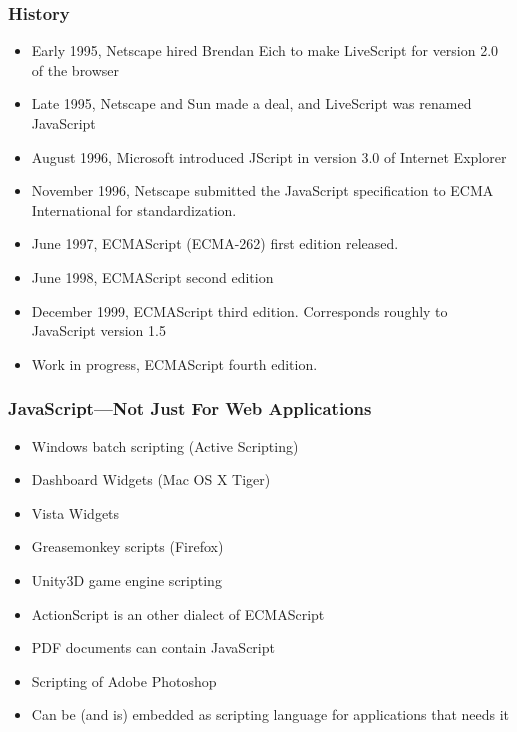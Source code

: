 \documentclass[dvipsnames,handout]{beamer}
\begin{document}
\begin{frame} 
\frametitle{History}

\begin{itemize}
\item Early 1995, Netscape hired Brendan Eich to make LiveScript for
  version 2.0 of the browser
\item Late 1995, Netscape and Sun made a deal, and LiveScript was
  renamed JavaScript
\item August 1996, Microsoft introduced JScript in version 3.0 of Internet
  Explorer
\item November 1996, Netscape submitted the JavaScript specification
  to ECMA International for standardization.
\item June 1997, ECMAScript (ECMA-262) first edition released.
\item June 1998, ECMAScript second edition
\item December 1999, ECMAScript third edition.  Corresponds roughly
  to JavaScript version 1.5
\item Work in progress, ECMAScript fourth edition.
\end{itemize}
  
\end{frame}


\begin{frame} 
\frametitle{JavaScript---Not Just For Web Applications}

\begin{itemize}
\item Windows batch scripting (Active Scripting)
\item Dashboard Widgets (Mac OS X Tiger)
\item Vista Widgets
\item Greasemonkey scripts (Firefox)
\item Unity3D game engine scripting
\item ActionScript is an other dialect of ECMAScript
\item PDF documents can contain JavaScript
\item Scripting of Adobe Photoshop
\item Can be (and is) embedded as scripting language for applications
  that needs it
\end{itemize}
  
\end{frame}
\end{document}
